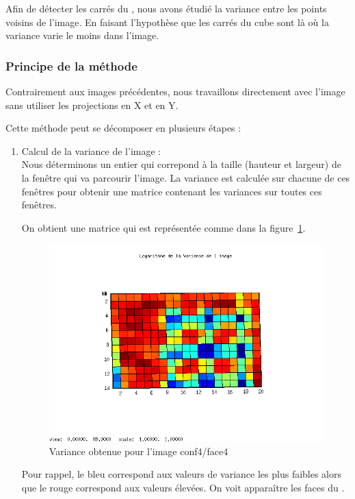   Afin de détecter les carrés du \rubic{}, nous avons étudié la variance entre les points voisins de l'image. 
En faisant l'hypothèse que les carrés du cube sont là où la variance varie le moins dans l'image. 

\subsubsection*{Principe de la méthode} 

  Contrairement aux images précédentes, nous travaillons directement avec l'image sans utiliser les projections en X et en Y. 

Cette méthode peut se décomposer en plusieurs étapes : 
\begin{enumerate}
  \item Calcul de la variance de l'image : \\
  Nous déterminons un entier qui correpond à la taille (hauteur et largeur) de la fenêtre qui va parcourir l'image. 
La variance est calculée sur chacune de ces fenêtres pour obtenir une matrice contenant les variances sur toutes ces fenêtres. 

On obtient une matrice qui est représentée comme dans la figure~\ref{variance2D_VARavant}. 

\begin{figure}[!ht]
\centering
\includegraphics[width=\linewidth]{Images/Variance2D_variance_avan_2.png}
\caption{Variance obtenue pour l'image conf4/face4}
\label{variance2D_VARavant}
\end{figure}

  Pour rappel, le bleu correspond aux valeurs de variance les plus faibles alors que le rouge correspond aux valeurs élevées.
On voit apparaître les faces du \rubic{}. 


\end{enumerate}
